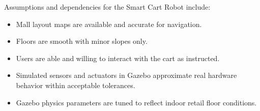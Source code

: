 Assumptions and dependencies for the Smart Cart Robot include:
\begin{itemize}
  \item Mall layout maps are available and accurate for navigation.
  \item Floors are smooth with minor slopes only.
  \item Users are able and willing to interact with the cart as instructed.
  \item Simulated sensors and actuators in Gazebo approximate real hardware behavior within acceptable tolerances.
  \item Gazebo physics parameters are tuned to reflect indoor retail floor conditions.
\end{itemize}

